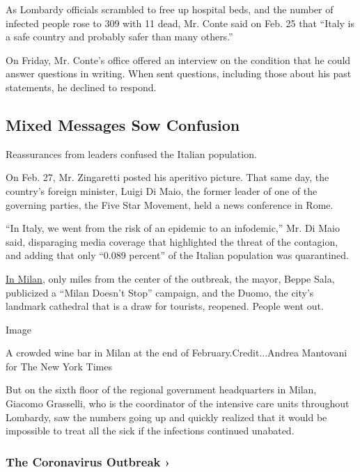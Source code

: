 As Lombardy officials scrambled to free up hospital beds, and the number
of infected people rose to 309 with 11 dead, Mr. Conte said on Feb. 25
that ``Italy is a safe country and probably safer than many others.''

On Friday, Mr. Conte's office offered an interview on the condition that
he could answer questions in writing. When sent questions, including
those about his past statements, he declined to respond.

\hypertarget{mixed-messages-sow-confusion}{%
\subsection{Mixed Messages Sow
Confusion}\label{mixed-messages-sow-confusion}}

Reassurances from leaders confused the Italian population.

On Feb. 27, Mr. Zingaretti posted his aperitivo picture. That same day,
the country's foreign minister, Luigi Di Maio, the former leader of one
of the governing parties, the Five Star Movement, held a news conference
in Rome.

``In Italy, we went from the risk of an epidemic to an infodemic,'' Mr.
Di Maio said, disparaging media coverage that highlighted the threat of
the contagion, and adding that only ``0.089 percent'' of the Italian
population was quarantined.

\href{https://www.nytimes3xbfgragh.onion/2020/02/27/world/europe/milan-coronavirus.html?searchResultPosition=6}{In
Milan}, only miles from the center of the outbreak, the mayor, Beppe
Sala, publicized a ``Milan Doesn't Stop'' campaign, and the Duomo, the
city's landmark cathedral that is a draw for tourists, reopened. People
went out.

Image

A crowded wine bar in Milan at the end of February.Credit...Andrea
Mantovani for The New York Times

But on the sixth floor of the regional government headquarters in Milan,
Giacomo Grasselli, who is the coordinator of the intensive care units
throughout Lombardy, saw the numbers going up and quickly realized that
it would be impossible to treat all the sick if the infections continued
unabated.

\href{https://www.nytimes3xbfgragh.onion/news-event/coronavirus?action=click\&pgtype=Article\&state=default\&region=MAIN_CONTENT_3\&context=storylines_faq}{}

\hypertarget{the-coronavirus-outbreak-}{%
\subsubsection{The Coronavirus Outbreak
›}\label{the-coronavirus-outbreak-}}

